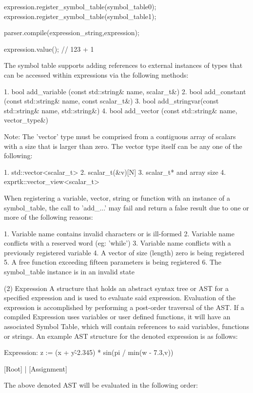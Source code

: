 expression.register\_symbol\_table(symbol\_table0);
expression.register\_symbol\_table(symbol\_table1);

parser.compile(expression\_string,expression);

expression.value(); // 123 + 1


The symbol table supports  adding references to external  instances of
types  that  can  be accessed  within  expressions  via the  following
methods:

1. bool add\_variable (const std::string\& name,       scalar\_t\&)
2. bool add\_constant (const std::string\& name, const scalar\_t\&)
3. bool add\_stringvar(const std::string\& name,    std::string\&)
4. bool add\_vector   (const std::string\& name,    vector\_type\&)


Note: The 'vector' type must  be comprised from a contiguous  array of
scalars with a size that is  larger than zero. The vector type  itself
can be any one of the following:

1. std::vector<scalar\_t>
2. scalar\_t(\&v)[N]
3. scalar\_t* and array size
4. exprtk::vector\_view<scalar\_t>


When  registering  a variable,  vector,  string or  function  with  an
instance of a symbol\_table, the call to 'add\_...' may fail and  return
a false result due to one or more of the following reasons:

1. Variable name contains invalid characters or is ill-formed
2. Variable name conflicts with a reserved word (eg: 'while')
3. Variable name conflicts with a previously registered variable
4. A vector of size (length) zero is being registered
5. A free function exceeding fifteen parameters is being registered
6. The symbol\_table instance is in an invalid state


(2) Expression
A structure that holds an abstract syntax tree or AST for a  specified
expression and is used to evaluate said expression. Evaluation of  the
expression is accomplished by performing a post-order traversal of the
AST.  If  a  compiled  Expression  uses  variables  or  user   defined
functions, it will have an associated Symbol Table, which will contain
references  to said  variables, functions  or strings. An example  AST
structure for the denoted expression is as follows:

Expression:  z := (x + y\^-2.345) * sin(pi / min(w - 7.3,v))

[Root]
|
[Assignment]

The above denoted AST will be evaluated in the following order:

